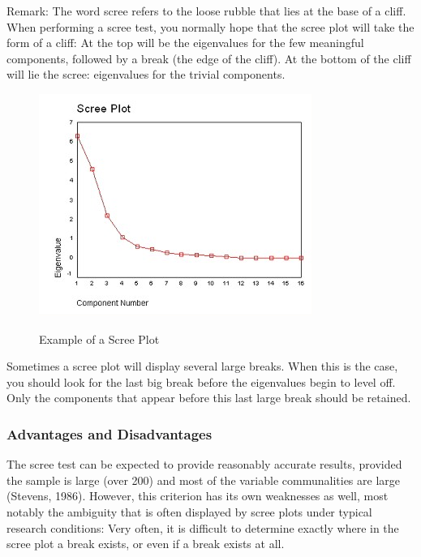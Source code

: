 \documentclass[a4paper,12pt]{article}
\begin{document}
	Remark: The word scree refers to the loose rubble that lies at
	the base of a cliff.  When performing a scree test, you normally hope that the scree plot
	will take the form of a cliff:  At the top will be the eigenvalues for the few meaningful
	components, followed by a break (the edge of the cliff).  At the bottom of the cliff will lie
	the scree:  eigenvalues for the trivial components.
	
	\begin{figure}[h!]
		\begin{center}
			\includegraphics[scale=0.9]{3AScree1.jpg}\\
			\caption{Example of a Scree Plot}\label{Scree Plot}
		\end{center}
		
	\end{figure}
	
	
	Sometimes a scree plot will display several large breaks.  When this is the case, you should look
	for the last big break before the eigenvalues begin to level off. Only the components that appear
	before this last large break should be retained.
	
	\subsubsection{Advantages and Disadvantages}
	The scree test can be expected to provide reasonably accurate results, provided the sample is
	large (over 200) and most of the variable communalities are large (Stevens, 1986).  However,
	this criterion has its own weaknesses as well, most notably the ambiguity that is often displayed
	by scree plots under typical research conditions:  Very often, it is difficult to determine exactly
	where in the scree plot a break exists, or even if a break exists at all.
	
\end{document}
